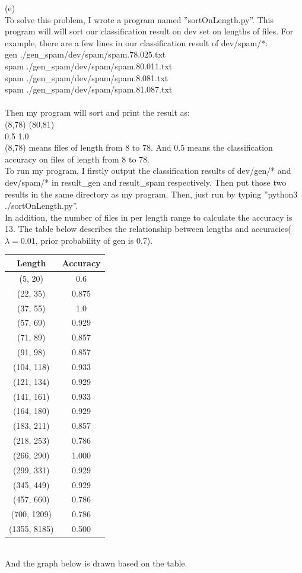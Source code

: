 \documentclass[11pt]{article}
\begin{document}
(e)\\
To solve this problem, I wrote a program named ''sortOnLength.py''. This program will will sort our classification result on dev set on lengths of files.
For example, there are a few lines in our classification result of dev/spam/*:\\
gen	./gen\_spam/dev/spam/spam.78.025.txt\\
spam	./gen\_spam/dev/spam/spam.80.011.txt\\
spam	./gen\_spam/dev/spam/spam.8.081.txt\\
spam	./gen\_spam/dev/spam/spam.81.087.txt\\
\\
Then my program will sort and print the result as:\\
(8,78)   (80,81)\\
 0.5    \hspace{1cm}          1.0\\
(8,78) means files of length from 8 to 78. And 0.5 means the classification accuracy on files of length from 8 to 78.\\
To run my program, I firstly output the classification results of dev/gen/* and dev/spam/* in result\_gen and result\_spam respectively. Then put those two results in the same directory as my program. Then, just run by typing ''python3 ./sortOnLength.py''.\\
In addition, the number of files in per length range to calculate the accuracy is 13.
The table below describes the relationship between lengths and accuracies($\lambda=0.01$, prior probability of gen is 0.7).\\
\begin{tabular}{|c|c|} 
\hline 
Length&Accuracy\\
\hline  
(5, 20)&0.6\\
\hline
(22, 35)&0.875\\
\hline
(37, 55)&1.0\\
\hline
(57, 69)&0.929\\
\hline
(71, 89)&0.857\\
\hline
(91, 98)&0.857\\
\hline
(104, 118)&0.933\\
\hline
(121, 134)&0.929\\
\hline
(141, 161)&0.933\\
\hline
(164, 180)&0.929\\
\hline
(183, 211)&0.857\\
\hline
(218, 253)&0.786\\
\hline
(266, 290)&1.000\\
\hline
(299, 331)&0.929\\
\hline
(345, 449)&0.929\\
\hline
(457, 660)&0.786\\
\hline
(700, 1209)&0.786\\
\hline
(1355, 8185)&0.500\\
\hline
\end{tabular}\\
And the graph below is drawn based on the table.\\
\end{document}
